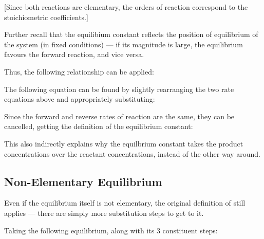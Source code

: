 			\mathdiagram{
				\[ R_{fwd} = k_{fwd}[\ch{N2O4}]  \qquad\qquad  R_{rev} = k_{rev}[\ch{NO2}]^{2} \]
			}[Since both reactions are elementary, the orders of reaction correspond to the stoichiometric coefficients.]

			\pagebreak

			Further recall that the equilibium constant reflects the position of equilibrium of the system (in fixed conditions) --- if its magnitude
			is large, the equilibrium favours the forward reaction, and vice versa.

			Thus, the following relationship can be applied:

			\mathdiagram{
				\[ K_{c} = \frac{k_{fwd}}{k_{rev}} \]
			}

			The following equation can be found by slightly rearranging the two rate equations above and appropriately substituting:

			\mathdiagram{
				\[ K_{c} \quad = \quad \frac{k_{fwd}}{k_{rev}} \quad = \quad \frac{R_{fwd}}{[\ch{N2O4}]}
				\; / \; \frac{R_{rev}}{[\ch{NO2}]^{2}} \]
			}

			Since the forward and reverse rates of reaction are the same, they can be cancelled, getting the definition of the equilibrium constant:

			\mathdiagram{
				\[ K_{c} = \frac{[\ch{NO2}]^{2}}{[\ch{N2O4}]} \]
			}

			This also indirectly explains why the equilbrium constant takes the product concentrations over the reactant concentrations, instead of
			the other way around.


		\pagebreak
		\subsection{Non-Elementary Equilibrium}

			Even if the equilibrium itself is not elementary, the original definition of \Kc{} still applies --- there are simply more substitution
			steps to get to it.

			Taking the following equilibrium, along with its 3 constituent steps:

